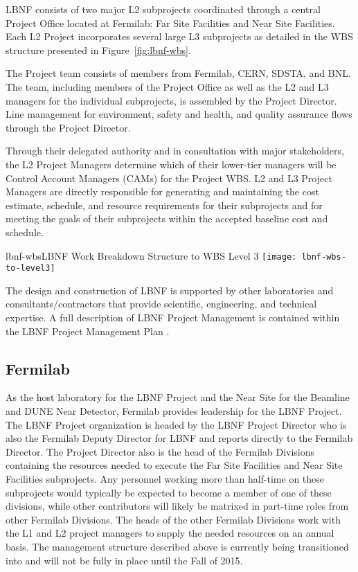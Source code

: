 LBNF consists of two major L2 subprojects coordinated through a central Project Office located at Fermilab: Far Site Facilities and Near Site Facilities. Each L2 Project incorporates several large L3 subprojects as detailed in the WBS structure presented in Figure~\ref{fig:lbnf-wbs}.

The Project team consists of members from Fermilab, CERN, SDSTA, and BNL.  The team, including members of the Project Office as well as the L2 and L3 managers for the individual subprojects, is assembled by the Project Director. 
Line management for environment, safety and health, and quality assurance flows through the Project Director. 

Through their delegated authority and in consultation with major stakeholders, the L2 Project Managers determine which of their lower-tier managers will be Control Account Managers (CAMs) for the Project WBS. L2 and L3 Project Managers are directly responsible for generating and maintaining the cost estimate, schedule, and resource requirements for their subprojects and for meeting the goals of their subprojects within the accepted baseline cost and schedule. 

\begin{cdrfigure}{lbnf-wbs}{LBNF Work Breakdown Structure to WBS Level 3}
  \texttt{[image: lbnf-wbs-to-level3]}
\end{cdrfigure}

The design and construction of LBNF is supported by other laboratories and consultants/contractors that provide scientific, engineering, and technical expertise. A full description of LBNF Project Management is contained within the LBNF Project Management Plan \fixme{[ref]}.

\subsection{Fermilab}  %

As the host laboratory for the LBNF Project and the Near Site for the Beamline and DUNE Near Detector, Fermilab provides leadership for the LBNF Project. The LBNF Project organization is headed by the LBNF Project Director who is also the Fermilab Deputy Director for LBNF and reports directly to the Fermilab Director. The Project Director also is the head of the Fermilab Divisions containing the resources needed to execute the Far Site Facilities and Near Site Facilities subprojects.  Any personnel working more than half-time on these subprojects would typically be expected to become a member of one of these divisions, while other contributors will likely be matrixed in part-time roles from other Fermilab Divisions.  The heads of the other Fermilab Divisions work with the L1 and L2 project managers to supply the needed resources on an annual basis.  The management structure described above is currently being transitioned into and will not be fully in place until the Fall of 2015.  


